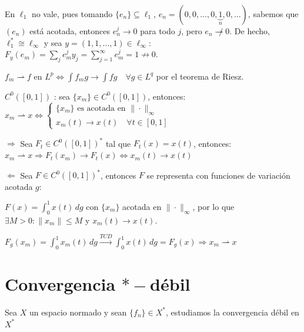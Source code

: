 \begin{observacion}
    En $\ell_1$ no vale, pues tomando $\{e_n\} \subseteq \ell_1$, $e_n=(0, 0, \dots, 0, \underbrace{1}_{n}, 0, \dots)$, sabemos que $(e_n)$ está acotada, entonces $e_n^j \longrightarrow 0$ para todo $j$, pero $e_n \not\rightharpoonup 0$. De hecho, \\

    \noindent
    $\ell_1^* \cong \ell_\infty$ y sea $y = (1, 1, \dots, 1) \in \ell_\infty$: $F_y(e_m) = \sum_j e_m^j y_j = \sum_{j=1}^\infty e_m^j = 1 \not\to 0$.
\end{observacion}

\begin{ejemplo}
    $f_m \rightharpoonup f$ en $L^p \iff \int f_m g \longrightarrow \int f g \quad \forall g \in L^q$ por el teorema de Riesz.
\end{ejemplo}

\begin{ejemplo}
    $C^0([0,1])$ : sea $\{x_m\} \in C^0([0,1])$, entonces: 
    $x_m \rightharpoonup x \iff \begin{cases} \{x_m\} \text{ es acotada en } \|\cdot\|_\infty \\ x_m(t) \longrightarrow x(t) \quad \forall t \in [0,1] \end{cases}$

    $\Rightarrow$ Sea $F_t \in C^0([0,1])^*$ tal que $F_t(x) = x(t)$, entonces: 
    $x_m \rightharpoonup x \Rightarrow F_t(x_m) \longrightarrow F_t(x) \iff x_m(t) \longrightarrow x(t)$

    \vspace{1em}

    $\Leftarrow$ Sea $F \in C^0([0,1])^*$, entonces $F$ se representa con funciones de variación acotada $g$:

    $F(x) = \int_0^1 x(t) \, dg$ con $\{x_m\}$ acotada en $\|\cdot\|_\infty$, por lo que $\exists M > 0 : \|x_m\| \le M$ y $x_m(t) \longrightarrow x(t)$.

    $F_g(x_m) = \int_0^1 x_m(t) \, dg \xrightarrow{TCD} \int_0^1 x(t) \, dg = F_g(x) \Rightarrow x_m \rightharpoonup x$

\end{ejemplo}

\section{Convergencia $*-$débil}

\noindent
Sea $X$ un espacio normado y sean $\{f_n\} \in X^*$, estudiamos la convergencia débil en $X^*$

